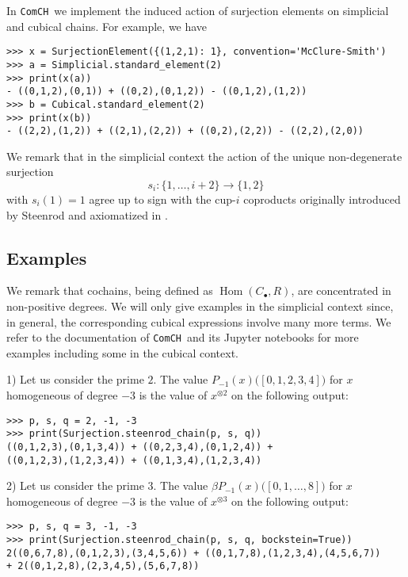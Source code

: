 \documentclass{amsart}
\newcommand{\chains}{C_\bullet}
\newcommand{\comch}{\texttt{ComCH}}
\DeclareMathOperator{\Hom}{Hom}
\begin{document}
In \comch\, we implement the induced action of surjection elements on simplicial and cubical chains.
For example, we have

\begin{Verbatim}[frame=lines, samepage=true]
>>> x = SurjectionElement({(1,2,1): 1}, convention='McClure-Smith')
>>> a = Simplicial.standard_element(2)
>>> print(x(a))
- ((0,1,2),(0,1)) + ((0,2),(0,1,2)) - ((0,1,2),(1,2))
>>> b = Cubical.standard_element(2)
>>> print(x(b))
- ((2,2),(1,2)) + ((2,1),(2,2)) + ((0,2),(2,2)) - ((2,2),(2,0))
\end{Verbatim}
We remark that in the simplicial context the action of the unique non-degenerate surjection
\begin{equation*}
	s_i \colon \{1, \dots, i+2\} \to \{1, 2\}
\end{equation*}
with $s_i(1) = 1$ agree up to sign with the cup-$i$ coproducts originally introduced by Steenrod \cite{Steenrod47, medina2021newformulas} and axiomatized in \cite{medina2018axiomatic}.

\subsection{Examples}

We remark that cochains, being defined as $ \Hom(\chains, R)$, are concentrated in non-positive degrees.
We will only give examples in the simplicial context since, in general, the corresponding cubical expressions involve many more terms.
We refer to the documentation of \comch\, and its Jupyter notebooks for more examples including some in the cubical context.

1) Let us consider the prime $2$.
The value $P_{-1}(x)\big([0,1,2,3,4]\big)$ for $x$ homogeneous of degree $-3$ is the value of $x^{\otimes 2}$ on the following output:

\begin{Verbatim}[frame=lines, samepage=true]
>>> p, s, q = 2, -1, -3
>>> print(Surjection.steenrod_chain(p, s, q))
((0,1,2,3),(0,1,3,4)) + ((0,2,3,4),(0,1,2,4)) +
((0,1,2,3),(1,2,3,4)) + ((0,1,3,4),(1,2,3,4))
\end{Verbatim}

2) Let us consider the prime $3$.
The value $\beta P_{-1}(x)\big([0,1,\dots,8]\big)$ for $x$ homogeneous of degree $-3$ is the value of $x^{\otimes 3}$ on the following output:

\begin{Verbatim}[frame=lines, samepage=true]
>>> p, s, q = 3, -1, -3
>>> print(Surjection.steenrod_chain(p, s, q, bockstein=True))
2((0,6,7,8),(0,1,2,3),(3,4,5,6)) + ((0,1,7,8),(1,2,3,4),(4,5,6,7))
+ 2((0,1,2,8),(2,3,4,5),(5,6,7,8))
\end{Verbatim}
\end{document}
